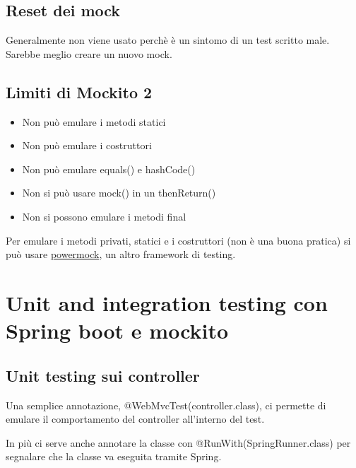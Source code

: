 \documentclass[11pt,a4paper]{book}
\begin{document}
\section{Reset dei mock}
Generalmente non viene usato perchè è un sintomo di un test scritto male. Sarebbe meglio creare un nuovo mock.




\section{Limiti di Mockito 2}
\begin{itemize}
	\item Non può emulare i metodi statici
	\item Non può emulare i costruttori
	\item Non può emulare equals() e hashCode()
	\item Non si può usare mock() in un thenReturn()
	\item Non si possono emulare i metodi final
\end{itemize}

Per emulare i metodi privati, statici e i costruttori (non è una buona pratica) si può usare \href{https://github.com/powermock/powermock}{powermock}, un altro framework di testing.

\chapter{Unit and integration testing con Spring boot e mockito}
\section{Unit testing sui controller}
Una semplice annotazione, @WebMvcTest(controller.class), ci permette di emulare il comportamento del controller all'interno del test.

In più ci serve anche annotare la classe con @RunWith(SpringRunner.class) per segnalare che la classe va eseguita tramite Spring.
\end{document}
